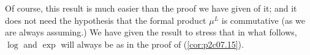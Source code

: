 \documentclass[../main]{subfiles}
\begin{document}
Of course, this result is much easier than the proof we have given of it; and it does not need the hypothesis that the formal product $\mu^L$ is commutative (as we are always assuming.) We have given the result to stress that in what follows, $\log$ and $\exp$ will always be as in the proof of (\ref{cor:p2c07.15}). 
\end{document}
